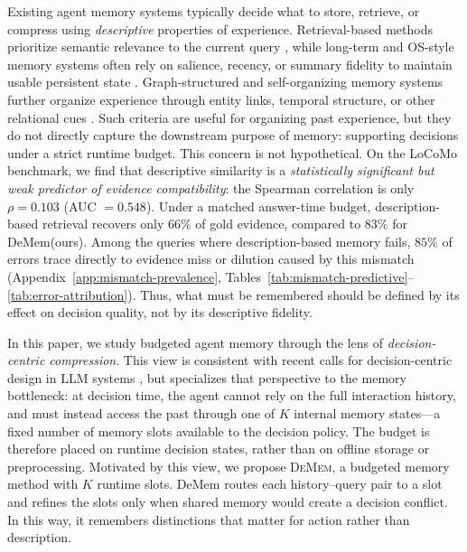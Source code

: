 \documentclass{article}
\theoremstyle{plain}
\theoremstyle{definition}
\theoremstyle{remark}
\begin{document}
Existing agent memory systems typically decide what to store, retrieve, or
compress using \emph{descriptive} properties of experience. Retrieval-based
methods prioritize semantic relevance to the current query
\citep{lewis2021retrievalaugmentedgenerationknowledgeintensivenlp}, while
long-term and OS-style memory systems often rely on salience, recency, or
summary fidelity to maintain usable persistent state
\citep{packer2024memgptllmsoperatingsystems,NEURIPS2023_ebd82705}.
Graph-structured and self-organizing memory systems further organize experience
through entity links, temporal structure, or other relational cues
\citep{gutiérrez2025hipporagneurobiologicallyinspiredlongterm,
chhikara2025mem0buildingproductionreadyai,
nan2025nemoriselforganizingagentmemory}.
Such criteria are useful for organizing past experience, but they do not directly capture the downstream purpose of memory: supporting decisions under a strict runtime budget. 
This concern is not hypothetical. On the LoCoMo benchmark, we find that descriptive similarity is a
\emph{statistically significant but weak predictor of evidence compatibility}:
the Spearman correlation is only $\rho = 0.103$ (AUC $= 0.548$). Under a matched answer-time budget,
description-based retrieval recovers only $66\%$ of gold evidence,
compared to $83\%$ for DeMem(ours).
Among the queries where description-based memory fails, $85\%$ of
errors trace directly to evidence miss or dilution caused by this
mismatch (Appendix~\ref{app:mismatch-prevalence},
Tables~\ref{tab:mismatch-predictive}--\ref{tab:error-attribution}).
Thus, what must be remembered should be defined by its effect on
decision quality, not by its descriptive fidelity.

In this paper, we study budgeted agent memory through the lens of
\emph{decision-centric compression}. This view is consistent with recent calls
for decision-centric design in LLM systems \citep{Sun2026DecisionCentricDF},
but specializes that perspective to the memory bottleneck: at decision time,
the agent cannot rely on the full interaction history, and must instead access
the past through one of \(K\) internal memory states---a fixed number of memory slots available to the decision policy.  The budget is therefore placed on runtime decision states, rather than on offline storage or preprocessing.
Motivated by this view, we propose \textsc{DeMem}, a budgeted memory method with
\(K\) runtime slots. DeMem routes each history--query pair to a slot and refines
the slots only when shared memory would create a decision conflict. In this way,
it remembers distinctions that matter for action rather than description.
\end{document}
